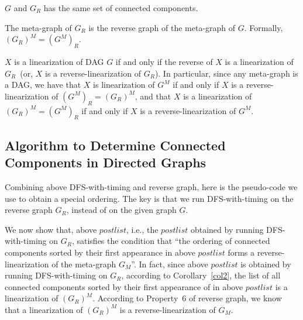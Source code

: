 \begin{property}
$G$ and $G_R$ has the same set of connected components. %
\end{property}


\begin{property}
The meta-graph of $G_R$ is the reverse graph of the meta-graph of $G$. Formally, $(G_R)^M = (G^M)_R$.
\end{property}

\begin{property}
$X$ is a linearization of DAG $G$ if and only if the reverse of $X$ is a linearization of $G_R$~(or, $X$ is a reverse-linearization of $G_R$).
In particular, since any meta-graph is a DAG, we have that 
$X$ is linearization of $G^M$ if and only if $X$ is a reverse-linearization of $(G^M)_R = (G_R)^M$,
and that $X$ is a linearization of $(G_R)^M = (G^M)_R$ if and only if $X$ is a reverse-linearization of $G^M$.
\end{property}


\subsection*{Algorithm to Determine Connected Components in Directed Graphs}

Combining above DFS-with-timing and reverse graph, here is the pseudo-code we use to obtain a special ordering.
The key is that we run DFS-with-timing on the reverse graph $G_R$, instead of on the given graph $G$.

\begin{minipage}{0.8\textwidth}
	\xxx
	\xxx
	\xxx
	\xxx
	\xxx
\end{minipage}

We now show that, above $postlist$, i.e., the $postlist$ obtained by running DFS-with-timing on $G_R$,
satisfies the condition that ``the ordering of connected components sorted by their first appearance in above
$postlist$ forms a reverse-linearization of the meta-graph $G_M$''.
In fact, since above $postlist$ is obtained by running DFS-with-timing on $G_R$,
according to Corollary~\ref{col2}, 
the list of all connected components sorted by their first appearance of in above $postlist$ is a linearization of $(G_R)^M$.
According to Property~6 of reverse graph, we know that a linearization of $(G_R)^M$ is a reverse-linearization of $G_M$.

